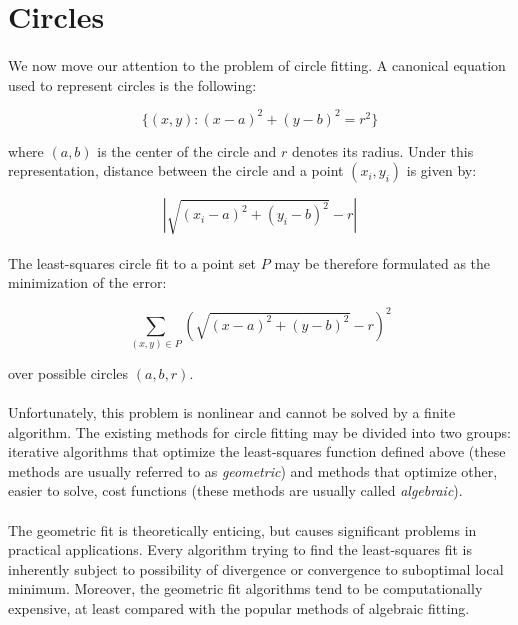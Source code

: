 \section{Circles}

\paragraph*{}
We now move our attention to the problem of circle fitting. A canonical equation used to represent circles is the following:

\[
	\{(x,y): (x-a)^2 + (y-b)^2 = r^2\}
\]

where $(a,b)$ is the center of the circle and $r$ denotes its radius. Under this representation, distance between the circle and a point $(x_i, y_i)$ is given by:

\[
	|\sqrt{(x_i-a)^2 + (y_i-b)^2} - r|
\]

\paragraph*{}
The least-squares circle fit to a point set $P$ may be therefore formulated as the minimization of the error:

\[
	\sum_{(x,y) \in P} (\sqrt{(x-a)^2 + (y-b)^2} - r)^2
\]

over possible circles $(a,b,r)$.


\paragraph*{}
Unfortunately, this problem is nonlinear and cannot be solved by a finite algorithm. The existing methods for circle fitting may be divided into two groups: iterative algorithms that optimize the least-squares function defined above (these methods are usually referred to as \textit{geometric}) and methods that optimize other, easier to solve, cost functions (these methods are usually called \textit{algebraic}).

\paragraph*{}
The geometric fit is theoretically enticing, but causes significant problems in practical applications. Every algorithm trying to find the least-squares fit is inherently subject to possibility of divergence or convergence to suboptimal local minimum. Moreover, the geometric fit algorithms tend to be computationally expensive, at least compared with the popular methods of algebraic fitting.

